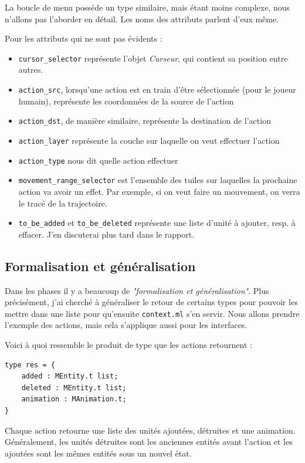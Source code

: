 \documentclass{article}
\begin{document}
La boucle de menu posséde un type similaire, mais étant moins complexe, nous n'allons pas l'aborder en détail. Les noms des attributs parlent d'eux même.

Pour les attributs qui ne sont pas évidents : 

\begin{itemize}
    \item \texttt{cursor\_selector} représente l'objet \textit{Curseur}, qui contient sa position entre autres.
    \item \texttt{action\_src}, lorsqu'une action est en train d'être sélectionnée (pour le joueur humain), représente les coordonnées de la source
de l'action
    \item \texttt{action\_dst}, de manière similaire, représente la destination de l'action
    \item \texttt{action\_layer} représente la couche sur laquelle on veut effectuer l'action
    \item \texttt{action\_type} nous dit quelle action effectuer
    \item \texttt{movement\_range\_selector} est l'ensemble des tuiles sur laquelles la prochaine action va avoir un effet. Par exemple,
    si on veut faire un mouvement, on verra le tracé de la trajectoire.
    \item \texttt{to\_be\_added} et \texttt{to\_be\_deleted} représente une liste d'unité à ajouter, resp. à effacer.
    J'en discuterai plus tard dans le rapport. 
\end{itemize}
\subsection{Formalisation et généralisation}
Dans les phases il y a beaucoup de \textit{"formalisation et généralisation"}. Plus précisément, j'ai cherché
à généraliser le retour de certains types pour pouvoir les mettre dans une liste pour qu'ensuite \texttt{context.ml} s'en servir.
Nous allons prendre l'exemple des actions, mais cela s'applique aussi pour les interfaces.

Voici à quoi ressemble le produit de type que les actions retournent : 

\begin{verbatim}
type res = {
    added : MEntity.t list;
    deleted : MEntity.t list;
    animation : MAnimation.t;
}
\end{verbatim}

Chaque action retourne une liste des unités ajoutées, détruites et une animation. Généralement, les unités détruites
sont les anciennes entités avant l'action et les ajoutées sont les mêmes entités sous un nouvel état. 
\end{document}
